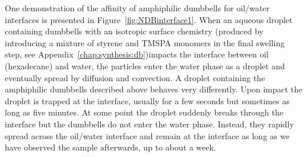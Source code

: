 One demonstration of the affinity of amphiphilic dumbbells for oil/water interfaces is presented in Figure~\ref{fig:NDBinterface1}.
When an aqueous droplet containing dumbbells with an isotropic surface chemistry (produced by introducing a mixture of styrene and TMSPA monomers in the final swelling step, see Appendix~\ref{chap:synthesis:db})impacts the interface between oil (hexadecane) and water, the particles enter the water phase as a droplet and eventually spread by diffusion and convection.
A droplet containing the amphiphilic dumbbells described above behaves very differently.
Upon impact the droplet is trapped at the interface, usually for a few seconds but sometimes as long as five minutes.
At some point the droplet suddenly breaks through the interface but the dumbbells do not enter the water phase.
Instead, they rapidly spread across the oil/water interface and remain at the interface as long as we have observed the sample afterwards, up to about a week.

